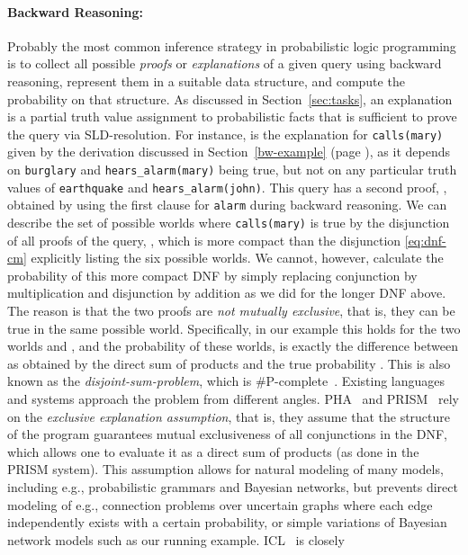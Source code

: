 \documentclass[a4paper]{article}
\begin{document}
\paragraph{Backward Reasoning:} Probably the most common inference strategy in probabilistic logic
programming is to  collect all possible \emph{proofs} or
\emph{explanations} of a given query using backward reasoning,
represent them in a suitable data structure, and compute the
probability on that structure. As discussed in Section~\ref{sec:tasks}, an explanation is a partial
truth value assignment to probabilistic facts that is sufficient to
prove the query via SLD-resolution. For instance,  is the explanation for
\verb|calls(mary)| given by the derivation discussed in Section~\ref{bw-example}
(page \pageref{bw-example}), as it
depends on 
\verb|burglary| and \verb|hears_alarm(mary)| being true, but not on
any particular truth values of \verb|earthquake| and
\verb|hears_alarm(john)|. This query has a second proof, ,
obtained by using the first clause for \verb|alarm| during backward
reasoning. We can describe the set of possible worlds where
\verb|calls(mary)| is true by the disjunction of all proofs of the
query, , which is more compact than the
disjunction \eqref{eq:dnf-cm} explicitly listing the six possible worlds. We
cannot, however, calculate the probability of this more compact DNF by
simply replacing conjunction by multiplication and disjunction by
addition as we did for the longer DNF above. The reason is that the
two proofs are \emph{not mutually exclusive}, that is, they can be
true in the same possible world. Specifically, in our example this
holds for  the two worlds  and , and the probability
of these worlds,  is exactly the difference between  as
obtained by the direct sum of products  and the true probability
. This is also known as the \emph{disjoint-sum-problem}, which is
\#P-complete~\citep{Valiant79}. Existing languages and systems approach the problem
from different angles. PHA~\citep{Poole92} and
PRISM~\citep{SatoKameya:01} rely on the \emph{exclusive explanation
  assumption}, that is, they assume that the structure of the program guarantees mutual
exclusiveness of all conjunctions in the DNF, which allows one to evaluate it as a
direct sum of products (as done in the PRISM system). This assumption
allows for natural modeling of many models,
including e.g., probabilistic grammars and Bayesian networks, but
prevents direct modeling of e.g., connection problems over uncertain graphs where each edge
independently exists with a certain probability, or simple
variations of Bayesian network models such as our running example. ICL~\citep{Poole00} is closely
\end{document}
